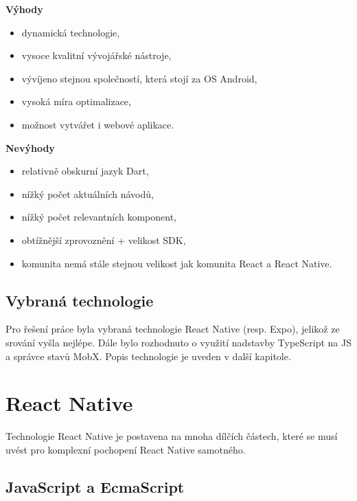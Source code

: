 \textbf{Výhody}

\begin{itemize}
	\item dynamická technologie,
	\item vysoce kvalitní vývojářské nástroje,
	\item vývíjeno stejnou společností, která stojí za OS Android,
	\item vysoká míra optimalizace,
	\item možnost vytvářet i webové aplikace.
\end{itemize}

\textbf{Nevýhody}

\begin{itemize}
	\item relativně obskurní jazyk Dart,
	\item nížký počet aktuálních návodů,
	\item nížký počet relevantních komponent,
	\item obtížnější zprovoznění + velikost SDK,
	\item komunita nemá stále stejnou velikost jak komunita React a React Native.
\end{itemize}

\subsection{Vybraná technologie}

Pro řešení práce byla vybraná technologie React Native (resp. Expo), jelikož ze srování vyšla nejlépe. Dále bylo rozhodnuto o využití nadstavby TypeScript na JS a správce stavů MobX. Popis technologie je uveden v další kapitole.

\section{React Native}

Technologie React Native je postavena na mnoha dílčích částech, které se musí uvést pro komplexní pochopení React Native samotného.

\subsection{JavaScript a EcmaScript}


